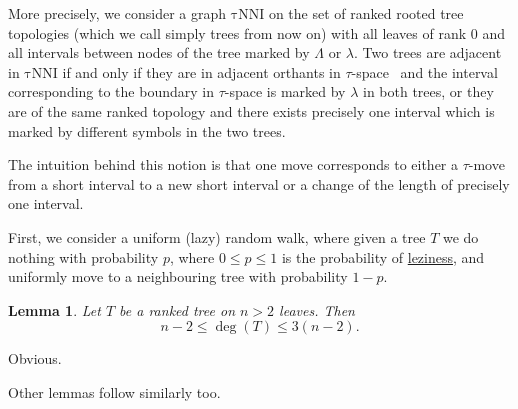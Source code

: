 \documentclass[12pt]{article}
\newtheorem{lemma}{Lemma}
\newcommand{\tN}{\mathrm{\tau NNI}}
\begin{document}
More precisely, we consider a graph $\tN$ on the set of ranked rooted tree topologies 
(which we call simply trees from now on) with
all leaves of rank $0$ and all intervals between nodes of the tree marked by $\Lambda$ or
$\lambda$. Two trees are adjacent in $\tN$ if and only if they are in adjacent orthants in 
$\tau$-space~\cite{GD} and the interval corresponding to the boundary in $\tau$-space
is marked by $\lambda$ in both trees, or they are of the same ranked topology and there 
exists precisely one interval which is marked by different symbols in the two trees. 

The intuition behind this notion is that one move corresponds to either 
a $\tau$-move from a short interval to a new short interval or a change of the length of 
precisely one interval. 

First, we consider a uniform (lazy) random walk, where given a tree $T$ we do nothing 
with probability $p$, where $0\leq p\leq 1$ is the probability of \href{https://academichelp.net/wp-content/uploads/2014/01/laziness.jpg}{leziness}, and uniformly move to a neighbouring tree with probability $1-p$. 

\begin{lemma}
Let $T$ be a ranked tree on $n>2$ leaves. Then \[n-2\leq \deg(T)\leq3(n-2).\] 
\end{lemma}

\proof
Obvious.
\endproof

Other lemmas follow similarly too. 
\end{document}
